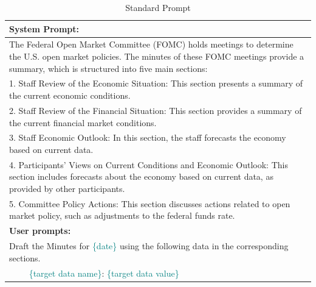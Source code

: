\begin{table}[h]
    \centering
    \footnotesize
    \begin{tabular}{p{14cm}}
        \toprule
        \textbf{System Prompt:} \\
        \hline
        The Federal Open Market Committee (FOMC) holds meetings to determine the U.S. open market policies. The minutes of these FOMC meetings provide a summary, which is structured into five main sections: \\
        1. Staff Review of the Economic Situation: This section presents a summary of the current economic conditions.\\
        2. Staff Review of the Financial Situation: This section provides a summary of the current financial market conditions.\\
        3. Staff Economic Outlook: In this section, the staff forecasts the economy based on current data.\\
        4. Participants' Views on Current Conditions and Economic Outlook: This section includes forecasts about the economy based on current data, as provided by other participants.\\
        5. Committee Policy Actions: This section discusses actions related to open market policy, such as adjustments to the federal funds rate. \\
        \hline
        \textbf{User prompts:} \\
        \hline
        Draft the Minutes for \textcolor{teal}{\{date\}} using the following data in the corresponding sections. \\
        $\qquad$ \textcolor{teal}{\{target data name\}}: \textcolor{teal}{\{target data value\}}     \\ 
        \bottomrule
    \end{tabular}
    \caption{Standard Prompt}
    \label{tab:ch2:standard_prompt}
\end{table}





